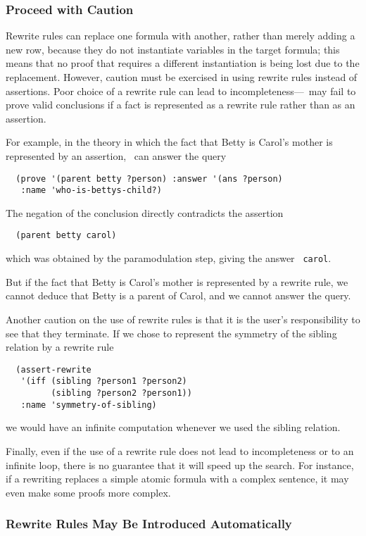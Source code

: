 \subsubsection{Proceed with Caution}
\label{subsubsec-rewrite-caution}

Rewrite rules can replace one formula with another, rather than merely
adding a new row, because they do not instantiate variables in the
target formula; this means that no proof that requires a different
instantiation is being lost due to the replacement.  However, caution
must be exercised in using rewrite rules instead of assertions.  Poor
choice of a rewrite rule can lead to incompleteness---\snark\  may fail
to prove valid conclusions if a fact is represented as a rewrite rule
rather than as an assertion.

For example, in the theory in which the fact that Betty is Carol's
mother is represented by an assertion, \snark\  can answer the query
\begin{verbatim}
  (prove '(parent betty ?person) :answer '(ans ?person)
   :name 'who-is-bettys-child?)
\end{verbatim}
The negation of the conclusion directly contradicts the assertion
\begin{verbatim}
  (parent betty carol)
\end{verbatim}
which was obtained by the paramodulation step, giving the answer {\tt
carol}.

But if the fact that Betty is Carol's mother is represented by a
rewrite rule, we cannot deduce that Betty is a parent of Carol, and we
cannot answer the query.

Another caution on the use of rewrite rules is that it is the user's
responsibility to see that they terminate.  If we chose to represent the
symmetry of the sibling relation by a rewrite rule
\begin{verbatim}
  (assert-rewrite
   '(iff (sibling ?person1 ?person2)
         (sibling ?person2 ?person1))
   :name 'symmetry-of-sibling)
\end{verbatim}
we would have an infinite computation whenever we used the sibling
relation.

Finally, even if the use of a rewrite rule does not lead to
incompleteness or to an infinite loop, there is no guarantee that it
will speed up the search.  For instance, if a rewriting replaces a
simple atomic formula with a complex sentence, it may even make some
proofs more complex.


\subsubsection{Rewrite Rules May Be Introduced Automatically}
\label{subsubsec-rewrite-automatic}

